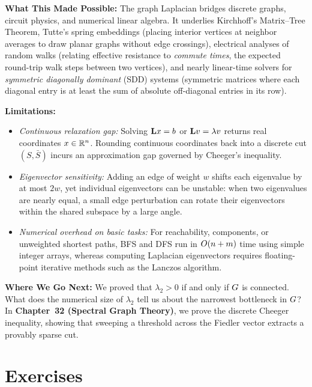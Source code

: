 \begin{connectionbox}
\textbf{What This Made Possible:}
The graph Laplacian bridges discrete graphs, circuit physics, and numerical linear algebra. It underlies Kirchhoff's Matrix--Tree Theorem, Tutte's spring embeddings (placing interior vertices at neighbor averages to draw planar graphs without edge crossings), electrical analyses of random walks (relating effective resistance to \emph{commute times}, the expected round-trip walk steps between two vertices), and nearly linear-time solvers for \emph{symmetric diagonally dominant} (SDD) systems (symmetric matrices where each diagonal entry is at least the sum of absolute off-diagonal entries in its row).

\textbf{Limitations:}
\begin{itemize}
  \item \emph{Continuous relaxation gap:} Solving $\mathbf{L} x = b$ or $\mathbf{L} v = \lambda v$ returns real coordinates $x \in \mathbb{R}^n$. Rounding continuous coordinates back into a discrete cut $(S,\bar S)$ incurs an approximation gap governed by Cheeger's inequality.
  \item \emph{Eigenvector sensitivity:} Adding an edge of weight $w$ shifts each eigenvalue by at most $2w$, yet individual eigenvectors can be unstable: when two eigenvalues are nearly equal, a small edge perturbation can rotate their eigenvectors within the shared subspace by a large angle.
  \item \emph{Numerical overhead on basic tasks:} For reachability, components, or unweighted shortest paths, BFS and DFS run in $O(n+m)$ time using simple integer arrays, whereas computing Laplacian eigenvectors requires floating-point iterative methods such as the Lanczos algorithm.
\end{itemize}

\textbf{Where We Go Next:}
We proved that $\lambda_2 > 0$ if and only if $G$ is connected. What does the numerical size of $\lambda_2$ tell us about the narrowest bottleneck in $G$? In \textbf{Chapter~32 (Spectral Graph Theory)}, we prove the discrete Cheeger inequality, showing that sweeping a threshold across the Fiedler vector extracts a provably sparse cut.
\end{connectionbox}

\section*{Exercises}

